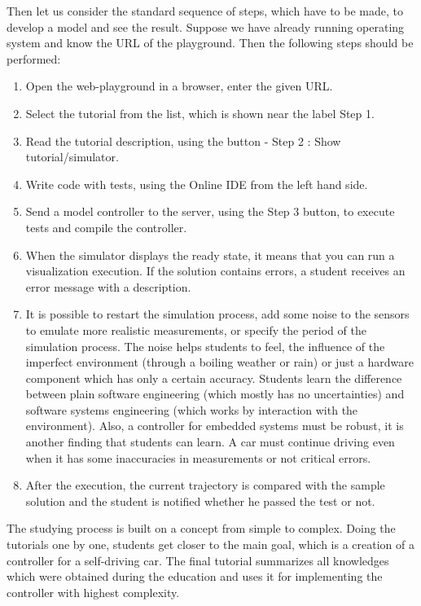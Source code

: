 Then let us consider the standard sequence of steps, which have to be made, to develop a model and see the result. Suppose we have already running operating system and know the URL of the playground. Then the following steps should be performed:
\begin{enumerate}
    \item Open the web-playground in a browser, enter the given URL.
    \item Select the tutorial from the list, which is shown near the label Step 1.
    \item Read the tutorial description, using the button - Step 2 : Show tutorial/simulator.
    \item Write code with tests, using the Online IDE from the left hand side.
    \item Send a model controller to the server, using the Step 3 button, to execute tests and compile the controller.
    \item When the simulator displays the ready state, it means that you can run a visualization execution. If the solution contains errors, a student receives an error message with a description.
    \item It is possible to restart the simulation process, add some noise to the sensors to emulate more realistic measurements, or specify the period of the simulation process. The noise helps students to feel, the influence of the imperfect environment (through a boiling weather or rain) or just a hardware component which has only a certain accuracy. Students learn the difference between plain software engineering (which mostly has no uncertainties) and software systems engineering (which works by interaction with the environment). Also, a controller for embedded systems must be robust, it is another finding that students can learn. A car must continue driving even when it has some inaccuracies in measurements or not critical errors.
    \item After the execution, the current trajectory is compared with the sample solution and the student is notified whether he passed the test or not.
\end{enumerate}
The studying process is built on a concept from simple to complex. Doing the tutorials one by one, students get closer to the main goal, which is a creation of a controller for a self-driving car. The final tutorial summarizes all knowledges which were obtained during the education and uses it for implementing the controller with highest complexity.

